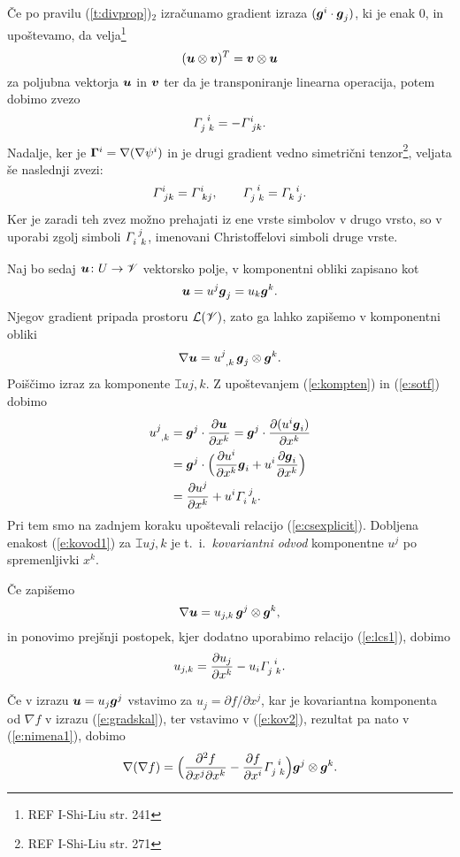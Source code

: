 Če po pravilu (\ref{t:divprop})$_2$ izračunamo gradient izraza $(\boldsymbol g^i\cdot\boldsymbol g_j)$,
ki je enak 0, in upoštevamo, da velja\footnote{REF I-Shi-Liu str. 241}
\[(\boldsymbol u\otimes\boldsymbol v)^{T}=\boldsymbol v\otimes\boldsymbol u\]
za poljubna vektorja $\boldsymbol u$ in $\boldsymbol v$ ter da je transponiranje linearna operacija,
potem dobimo zvezo
\begin{equation} \label{e:lcs1}
	\cs{j}{i}{k}=-\ks{i}{jk}.
\end{equation}
Nadalje, ker je $\mathbf \Gamma^i=\nabla(\nabla\psi^i)$ in je drugi gradient vedno
simetrični tenzor\footnote{REF I-Shi-Liu str. 271}, veljata še naslednji zvezi:
\[ \ks{i}{jk}=\ks{i}{kj},\qquad\cs{j}{i}{k}=\cs{k}{i}{j}. \]
Ker je zaradi teh zvez možno prehajati iz ene vrste simbolov v drugo vrsto,
so v uporabi zgolj simboli $\cs{i}{j}{k}$, imenovani Christoffelovi simboli druge vrste.

Naj bo sedaj $\boldsymbol u\colon U\to\mathscr V$ vektorsko polje, v komponentni obliki
zapisano kot
\[ \boldsymbol u=u^j\boldsymbol g_j=u_k\boldsymbol g^k. \]
Njegov gradient pripada prostoru $\mathcal L(\mathscr V)$, zato ga lahko zapišemo v komponentni obliki
\begin{equation} \label{e:gradukomp}
	\nabla\vek{u}=\topbot{u}{j}{,k}\,\vek{g}_j\otimes\vek{g}^k.
\end{equation}
Poiščimo izraz za komponente $\topbot{u}{j}{,k}$. Z upoštevanjem
(\ref{e:kompten}) in (\ref{e:sotf}) dobimo
\begin{align}
	\topbot{u}{j}{,k}&=\vek{g}^j\cdot\frac{\partial\vek{u}}{\partial x^k}=
	\vek{g}^j\cdot\frac{\partial(u^i\vek{g}_i)}{\partial x^k} \nonumber \\
	&=\vek{g}^j\cdot\Big(\frac{\partial u^i}{\partial x^k}\vek{g}_i+
	u^i\frac{\partial\vek{g}_i}{\partial x^k}\Big) \nonumber \\
	&=\frac{\partial u^j}{\partial x^k}+u^i\cs{i}{j}{k}. \label{e:kovod1}
\end{align}
Pri tem smo na zadnjem koraku upoštevali relacijo (\ref{e:csexplicit}). Dobljena enakost (\ref{e:kovod1})
za $\topbot{u}{j}{,k}$ je t.~i.~\emph{kovariantni odvod} komponentne $u^j$ po spremenljivki $x^k$.

Če zapišemo
\begin{equation} \label{e:nimena1}
	\nabla\boldsymbol u=u_{j,k}\,\boldsymbol g^j\otimes\boldsymbol g^k,
\end{equation}
in ponovimo prejšnji postopek, kjer dodatno uporabimo relacijo (\ref{e:lcs1}), dobimo
\begin{equation} \label{e:kov2}
	u_{j,k}=\frac{\partial u_j}{\partial x^k}-u_i\cs{j}{i}{k}.
\end{equation}
\begin{primer}
	Če v izrazu $\boldsymbol u=u_j\boldsymbol g^j$ vstavimo za $u_j=\partial f/\partial x^j$,
	kar je kovariantna komponenta od $\nabla f$ v izrazu (\ref{e:gradskal}), ter vstavimo v
	(\ref{e:kov2}), rezultat pa nato v (\ref{e:nimena1}), dobimo
	\begin{equation} \label{e:dvagrad}
		\nabla(\nabla f)=\Big(\frac{\partial^2 f}{\partial x^j\partial x^k}-
		\frac{\partial f}{\partial x^i}\cs{j}{i}{k}\Big)\vek{g}^j\otimes\vek{g}^k.
	\end{equation}
\end{primer}

